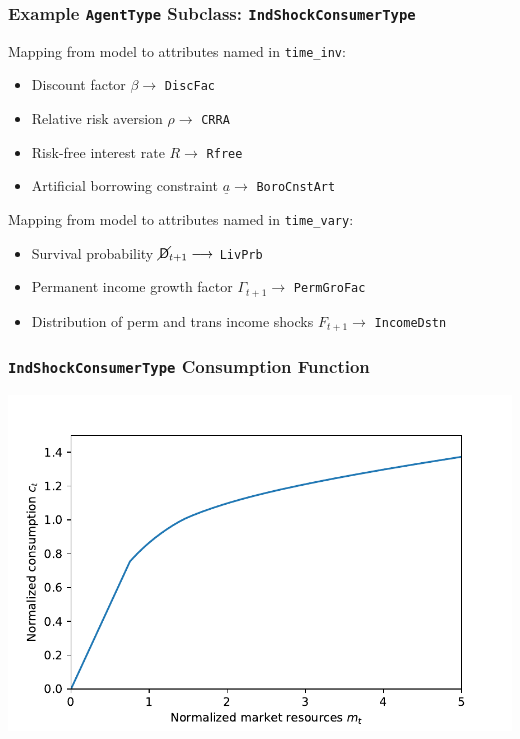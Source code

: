 \documentclass{beamer}
\newcommand{\bi}{\begin{itemize}}
\newcommand{\ei}{\end{itemize}}
\newcommand{\PDies}{\mathsf{D}}
\newcommand{\PLives}{\cancel{\PDies}}
\begin{document}
\begin{frame}
\frametitle{Example \texttt{AgentType} Subclass: \texttt{IndShockConsumerType}}

\begin{block}{Mapping from model to attributes named in \texttt{time\_inv}:}
\bi
\item Discount factor $\beta \longrightarrow$ \texttt{DiscFac}

\item Relative risk aversion $\rho \longrightarrow$ \texttt{CRRA}

\item Risk-free interest rate $R \longrightarrow$ \texttt{Rfree}

\item Artificial borrowing constraint $\underline{a} \longrightarrow$ \texttt{BoroCnstArt}
\ei
\end{block}


\begin{block}{Mapping from model to attributes named in \texttt{time\_vary}:}
\bi
\item Survival probability $\PLives_{t+1} \longrightarrow$ \texttt{LivPrb} 

\item Permanent income growth factor $\Gamma_{t+1} \longrightarrow$ \texttt{PermGroFac}

\item Distribution of perm and trans income shocks $F_{t+1} \longrightarrow$ \texttt{IncomeDstn}
\ei

\end{block}
\end{frame}


\begin{frame}
  \frametitle{\texttt{IndShockConsumerType} Consumption Function}
  \begin{center}
    \includegraphics[scale=0.65]{IndShockcFunc.pdf}
  \end{center}
\end{frame}
\end{document}
